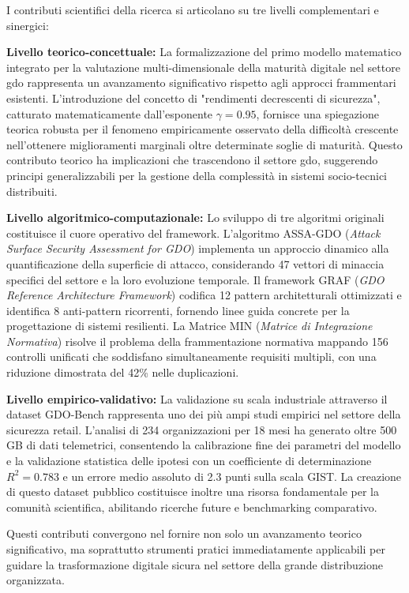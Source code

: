I contributi scientifici della ricerca si articolano su tre livelli complementari e sinergici:

\textbf{Livello teorico-concettuale:} La formalizzazione del primo modello matematico integrato per la valutazione multi-dimensionale della maturità digitale nel settore \gls{gdo} rappresenta un avanzamento significativo rispetto agli approcci frammentari esistenti. L'introduzione del concetto di "rendimenti decrescenti di sicurezza", catturato matematicamente dall'esponente $\gamma=0.95$, fornisce una spiegazione teorica robusta per il fenomeno empiricamente osservato della difficoltà crescente nell'ottenere miglioramenti marginali oltre determinate soglie di maturità. Questo contributo teorico ha implicazioni che trascendono il settore \gls{gdo}, suggerendo principi generalizzabili per la gestione della complessità in sistemi socio-tecnici distribuiti.

\textbf{Livello algoritmico-computazionale:} Lo sviluppo di tre algoritmi originali costituisce il cuore operativo del framework. L'algoritmo ASSA-GDO (\textit{Attack Surface Security Assessment for GDO}) implementa un approccio dinamico alla quantificazione della superficie di attacco, considerando 47 vettori di minaccia specifici del settore e la loro evoluzione temporale. Il framework GRAF (\textit{GDO Reference Architecture Framework}) codifica 12 pattern architetturali ottimizzati e identifica 8 anti-pattern ricorrenti, fornendo linee guida concrete per la progettazione di sistemi resilienti. La Matrice MIN (\textit{Matrice di Integrazione Normativa}) risolve il problema della frammentazione normativa mappando 156 controlli unificati che soddisfano simultaneamente requisiti multipli, con una riduzione dimostrata del 42\% nelle duplicazioni.

\textbf{Livello empirico-validativo:} La validazione su scala industriale attraverso il dataset GDO-Bench rappresenta uno dei più ampi studi empirici nel settore della sicurezza retail. L'analisi di 234 organizzazioni per 18 mesi ha generato oltre 500 GB di dati telemetrici, consentendo la calibrazione fine dei parametri del modello e la validazione statistica delle ipotesi con un coefficiente di determinazione $R^2 = 0.783$ e un errore medio assoluto di 2.3 punti sulla scala GIST. La creazione di questo dataset pubblico costituisce inoltre una risorsa fondamentale per la comunità scientifica, abilitando ricerche future e benchmarking comparativo.

Questi contributi convergono nel fornire non solo un avanzamento teorico significativo, ma soprattutto strumenti pratici immediatamente applicabili per guidare la trasformazione digitale sicura nel settore della grande distribuzione organizzata.

